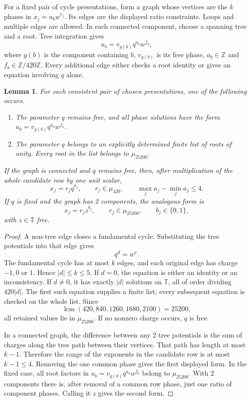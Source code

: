 \documentclass[11pt,a4paper]{article}
\newtheorem{lemma}[theorem]{Lemma}
\theoremstyle{plain}
\theoremstyle{definition}
\theoremstyle{plain}
\begin{document}
\medskip
For a fixed pair of cycle presentations, form a graph whose vertices are the $k$ phases in $x_j=u_bw^{e_j}$. Its edges are the displayed ratio constraints. Loops and multiple edges are allowed. In each connected component, choose a spanning tree and a root. Tree integration gives
\[
u_b=v_{g(b)}q^{a_b}w^{f_b},
\]
where $g(b)$ is the component containing $b$, $v_{g(b)}$ is its free phase, $a_b\in\mathbb Z$ and $f_b\in\mathbb Z/420\mathbb Z$. Every additional edge either checks a root identity or gives an equation involving $q$ alone.

\par\addvspace{\medskipamount}\noindent
\begin{minipage}{\linewidth}
\begin{lemma}\label{n11_full:graph}
For each consistent pair of chosen presentations, one of the following occurs.

\begin{enumerate}
\item The parameter $q$ remains free, and all phase solutions have the form $u_b=v_{g(b)}q^{a_b}w^{f_b}$.
\item The parameter $q$ belongs to an explicitly determined finite list of roots of unity. Every root in the list belongs to $\mu_{25200}$.
\end{enumerate}
If the graph is connected and $q$ remains free, then, after multiplication of the whole candidate row by one unit scalar,
$$x_j=r_jq^{a_j},\qquad r_j\in\mu_{420},\qquad
\max_j a_j-\min_j a_j\leq4.$$
If $q$ is fixed and the graph has 2 components, the analogous form is
$$x_j=r_jz^{b_j},\qquad r_j\in\mu_{25200},\qquad b_j\in\{0,1\},$$
with $z\in\mathbb T$ free.
\end{lemma}
\end{minipage}
\par\addvspace{\medskipamount}

\begin{proof}
A non-tree edge closes a fundamental cycle. Substituting the tree potentials into that edge gives
$$q^d=w^v.$$
The fundamental cycle has at most $k$ edges, and each original edge has charge $-1,0$ or $1$. Hence $|d|\leq k\leq5$. If $d=0$, the equation is either an identity or an inconsistency. If $d\ne0$, it has exactly $|d|$ solutions on $\mathbb T$, all of order dividing $420|d|$. The first such equation supplies a finite list; every subsequent equation is checked on the whole list. Since
$$\operatorname{lcm}(420,840,1260,1680,2100)=25200,$$
all retained values lie in $\mu_{25200}$. If no nonzero charge occurs, $q$ is free.

In a connected graph, the difference between any 2 tree potentials is the sum of charges along the tree path between their vertices. That path has length at most $k-1$. Therefore the range of the exponents in the candidate row is at most $k-1\leq4$. Removing the one common phase gives the first displayed form. In the fixed case, all root factors in $u_b=v_{g(b)}q^{a_b}w^{f_b}$ belong to $\mu_{25200}$. With 2 components there is, after removal of a common row phase, just one ratio of component phases. Calling it $z$ gives the second form.
\end{proof}
\end{document}
